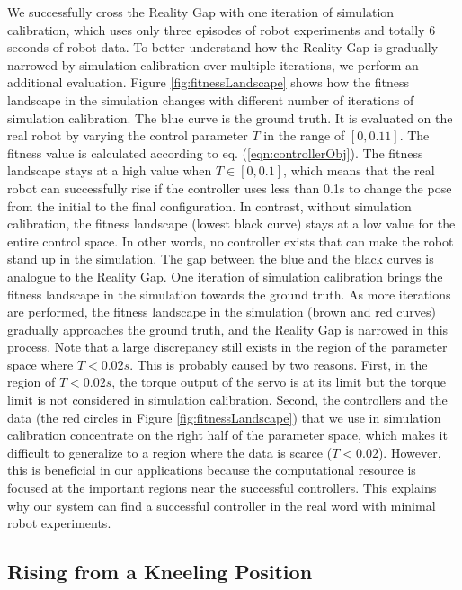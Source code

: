 We successfully cross the Reality Gap with one iteration of simulation calibration, which uses only three episodes of robot experiments and totally 6 seconds of robot data. To better understand how the Reality Gap is gradually narrowed by simulation calibration over multiple iterations, we perform an additional evaluation. Figure \ref{fig:fitnessLandscape} shows how the fitness landscape in the simulation changes with different number of iterations of simulation calibration. The blue curve is the ground truth. It is evaluated on the real robot by varying the control parameter $T$ in the range of $[0, 0.11]$. The fitness value is calculated according to eq. (\ref{eqn:controllerObj}). The fitness landscape stays at a high value when $T\in[0, 0.1]$, which means that the real robot can successfully rise if the controller uses less than 0.1s to change the pose from the initial to the final configuration. In contrast, without simulation calibration, the fitness landscape (lowest black curve) stays at a low value for the entire control space. In other words, no controller exists that can make the robot stand up in the simulation. The gap between the blue and the black curves is analogue to the Reality Gap. One iteration of simulation calibration brings the fitness landscape in the simulation towards the ground truth. As more iterations are performed, the fitness landscape in the simulation (brown and red curves) gradually approaches the ground truth, and the Reality Gap is narrowed in this process. Note that a large discrepancy still exists in the region of the parameter space where $T<0.02s$. This is probably caused by two reasons. First, in the region of $T<0.02s$, the torque output of the servo is at its limit but the torque limit is not considered in simulation calibration. Second, the controllers and the data (the red circles in Figure \ref{fig:fitnessLandscape}) that we use in simulation calibration concentrate on the right half of the parameter space, which makes it difficult to generalize to a region where the data is scarce ($T<0.02$). However, this is beneficial in our applications because the computational resource is focused at the important regions near the successful controllers. This explains why our system can find a successful controller in the real word with minimal robot experiments.

\subsection{Rising from a Kneeling Position}


